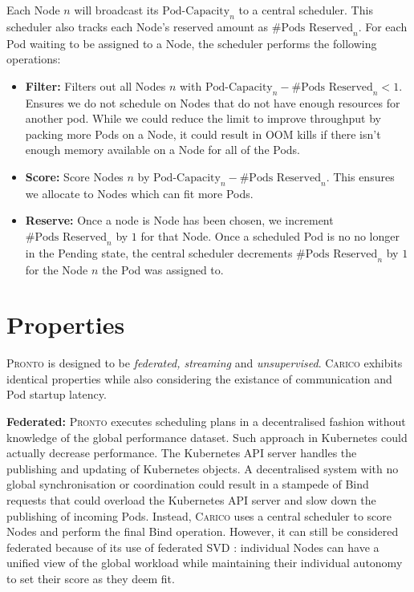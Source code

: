 Each Node $n$ will broadcast its $\text{Pod-Capacity}_n$ to a central scheduler. This
scheduler also tracks each Node's reserved amount as $\text{\# Pods Reserved}_n$. For
each Pod waiting to be assigned to a Node, the scheduler performs the following
operations:
\begin{itemize}
    \item \textbf{Filter:} Filters out all Nodes $n$ with $\text{Pod-Capacity}_n -
        \text{\# Pods Reserved}_n < 1$. Ensures we do not schedule on Nodes that do not
        have enough resources for another pod. While we could reduce the limit
        to improve throughput by packing more Pods on a Node, it could result in
        OOM kills if there isn't enough memory available on a Node for all of
        the Pods.
    \item \textbf{Score:} Score Nodes $n$ by $\text{Pod-Capacity}_n - \text{\#
        Pods Reserved}_n$. This ensures we allocate to Nodes which can fit more
        Pods.
    \item \textbf{Reserve:} Once a node is Node has been chosen, we increment
        $\text{\# Pods Reserved}_n$ by $1$ for that Node. Once a scheduled Pod
        is no no longer in the Pending state, the central scheduler decrements
        $\text{\# Pods Reserved}_n$ by $1$ for the Node $n$ the Pod was assigned
        to.
\end{itemize}

\section{Properties}
\textsc{Pronto} is designed to be \textit{federated, streaming} and
\textit{unsupervised}. \textsc{Carico} exhibits identical properties while also
considering the existance of communication and Pod startup latency.

\textbf{Federated:} \textsc{Pronto} executes scheduling plans in a decentralised fashion
without knowledge of the global performance dataset. Such approach in
Kubernetes could actually decrease performance. The Kubernetes API server
handles the publishing and updating of Kubernetes objects. A decentralised
system with no global synchronisation or coordination could result in a
stampede of Bind requests that could overload the Kubernetes API server and slow
down the publishing of incoming Pods. Instead, \textsc{Carico} uses a central scheduler
to score Nodes and perform the final Bind operation. However, it can still be
considered federated because of its use of federated SVD \cite{}: individual
Nodes can have a unified view of the global workload while maintaining their
individual autonomy to set their score as they deem fit.

